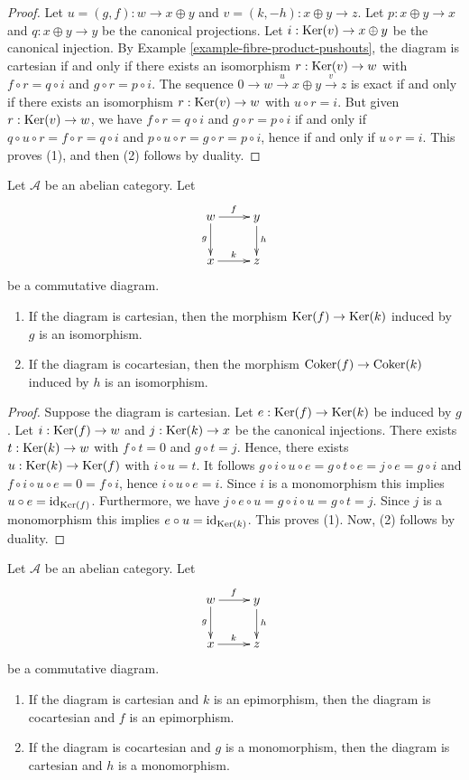 \begin{proof}
Let $u = (g, f) : w \to x \oplus y$ and $v =
(k, -h) : x \oplus y \to z$.
Let $p : x \oplus y \to x$ and $q : x \oplus
y \to y$ be the canonical
projections. Let $i : \mathop{\mathrm{Ker}}(v) \to x \oplus y$
be the canonical
injection. By Example
\ref{example-fibre-product-pushouts}, the
diagram is
cartesian if and only if there exists an
isomorphism
$r : \mathop{\mathrm{Ker}}(v) \to w$ with $f \circ r = q \circ
i$ and
$g \circ r = p \circ i$. The sequence
$0 \to w \overset{u} \to x \oplus y
\overset{v} \to z$ is exact if and
only if there exists an isomorphism $r :
\mathop{\mathrm{Ker}}(v) \to w$ with
$u \circ r = i$. But given $r : \mathop{\mathrm{Ker}}(v) \to
w$, we have
$f \circ r = q \circ i$ and $g \circ r = p
\circ i$ if and
only if $q \circ u \circ r= f \circ r = q
\circ i$ and
$p \circ u \circ r = g \circ r = p \circ i$,
hence if and only if
$u \circ r = i$. This proves (1), and then
(2) follows by duality.
\end{proof}

\begin{lemma}
\label{lemma-cartesian-kernel}
Let $\mathcal{A}$ be an abelian category. Let
$$
\xymatrix{
w\ar[r]^f\ar[d]_g
& y\ar[d]^h\\
x\ar[r]^k
& z
}
$$
be a commutative diagram.
\begin{enumerate}
\item If the diagram is cartesian, then the
morphism
$\mathop{\mathrm{Ker}}(f)\to\mathop{\mathrm{Ker}}(k)$ induced by $g$ is an
isomorphism.
\item If the diagram is cocartesian, then the
morphism
$\mathop{\mathrm{Coker}}(f)\to\mathop{\mathrm{Coker}}(k)$ induced by $h$ is an
isomorphism.
\end{enumerate}
\end{lemma}

\begin{proof}
Suppose the diagram is cartesian. Let
$e:\mathop{\mathrm{Ker}}(f)\to\mathop{\mathrm{Ker}}(k)$ be induced by $g$. Let
$i:\mathop{\mathrm{Ker}}(f)\to w$ and $j:\mathop{\mathrm{Ker}}(k)\to x$ be the
canonical
injections. There exists $t:\mathop{\mathrm{Ker}}(k)\to w$
with $f\circ t=0$
and $g\circ t=j$. Hence, there exists
$u:\mathop{\mathrm{Ker}}(k)\to\mathop{\mathrm{Ker}}(f)$
with $i\circ u=t$. It follows
$g\circ i\circ u\circ e=g\circ t\circ
e=j\circ e=g\circ i$ and
$f\circ i\circ u\circ e=0=f\circ i$, hence
$i\circ u\circ e=i$. Since
$i$ is a monomorphism this implies $u\circ
e=\text{id}_{\mathop{\mathrm{Ker}}(f)}$.
Furthermore, we have $j\circ e\circ u=g\circ
i\circ u=g\circ t=j$.
Since $j$ is a monomorphism this implies
$e\circ u=\text{id}_{\mathop{\mathrm{Ker}}(k)}$.
This proves (1). Now, (2) follows by duality.
\end{proof}

\begin{lemma}
\label{lemma-cartesian-cocartesian}
Let $\mathcal{A}$ be an abelian category. Let
$$
\xymatrix{
w\ar[r]^f\ar[d]_g
& y\ar[d]^h\\
x\ar[r]^k
& z
}
$$
be a commutative diagram.
\begin{enumerate}
\item If the diagram is cartesian and $k$ is
an epimorphism,
then the diagram is cocartesian and $f$ is an
epimorphism.
\item If the diagram is cocartesian and $g$
is a monomorphism,
then the diagram is cartesian and $h$ is a
monomorphism.
\end{enumerate}
\end{lemma}

